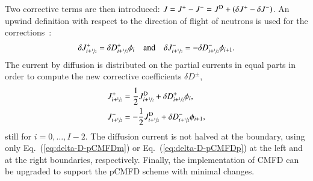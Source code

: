 \documentclass[review,3p,onecolumn,sort&compress]{elsarticle}
\newcommand{\eq}[1]{Eq.~(\ref{#1})}
\newcommand{\jp}{\ensuremath{J^+}}
\newcommand{\jm}{\ensuremath{J^-}}
\newcommand{\jpm}{\ensuremath{J^\pm}}
\newcommand{\jD}{\ensuremath{J^{\textrm{\scriptsize{D}}}}}
\newcommand{\hzi}{\ensuremath{\sfrac{1}{2}}}
\begin{document}
Two corrective terms are then introduced: $J = \jp - \jm = \jD + \left(\delta J^+ - \delta J^-\right)$. An upwind definition with respect to the direction of flight of neutrons is used for the corrections~\cite{Jarrett-2016,Zhu-2016}:
\begin{equation}
\label{eq:CCF-sub}
\delta \jp _{i+\hzi} = \delta D^+ _{i+\hzi} \phi_i
\quad \text{and} \quad
\delta \jm _{i+\hzi} = -\delta D^- _{i+\hzi} \phi_{i+1}.
\end{equation}
The current by diffusion is distributed on the partial currents in equal parts in order to compute the new corrective coefficients $\delta D^{\pm}$,
\begin{subequations}
	\label{eq:delta-D-pCMFD}
	\begin{align}
	J^+_{i+\hzi} &= \frac{1}{2}\jD_{i+\hzi} + \delta D^+_{i+\hzi} \phi_i, \label{eq:delta-D-pCMFDp}\\
	J^-_{i+\hzi} &= - \frac{1}{2}\jD_{i+\hzi} + \delta D^-_{i+\hzi} \phi_{i+1}, \label{eq:delta-D-pCMFDm}
	\end{align}
\end{subequations}
still for $i=0, \ldots, I-2$. The diffusion current is not halved at the boundary, using only \eq{eq:delta-D-pCMFDm} or \eq{eq:delta-D-pCMFDp} at the left and at the right boundaries, respectively. Finally, the implementation of CMFD can be upgraded to support the pCMFD scheme with minimal changes.
%
%
\end{document}
